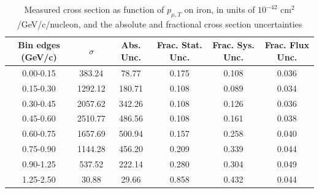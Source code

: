 \documentclass[../main.tex]{subfiles}
\begin{document}
\begin{table}
  \centering
  \renewcommand{\arraystretch}{1.15}
  \caption{Systematic covariance matrix of measured cross section in $p_{\mu,||}$ on iron, in units of $10^{-84}$ $(\text{cm}^2$/GeV/c/nucleon$)^2$}
  \label{tbl:sysnucleonnuc26muon_pzc}
\end{table}
\pagebreak
\begin{turnpage}
\end{turnpage}
\begin{table}
  \centering
  \renewcommand{\arraystretch}{1.15}
  \caption{Measured cross section as function of $p_{\mu,T}$ on iron, in units of $10^{-42}$ $\text{cm}^2$/GeV/c/nucleon, and the absolute and fractional cross section uncertainties}
    \begin{tabular}{c||c|c||c|c|c}
      Bin edges (GeV/c) &  $\sigma$  &  Abs. Unc.  &  Frac. Stat. Unc.  &  Frac. Sys. Unc.  &  Frac. Flux Unc. \\
      \hline
      \hline
      0.00-0.15 & 383.24 & 78.77 & 0.175 & 0.108 & 0.036\\
      0.15-0.30 & 1292.12 & 180.71 & 0.108 & 0.089 & 0.034\\
      0.30-0.45 & 2057.62 & 342.26 & 0.108 & 0.126 & 0.036\\
      0.45-0.60 & 2510.77 & 486.56 & 0.108 & 0.161 & 0.038\\
      0.60-0.75 & 1657.69 & 500.94 & 0.157 & 0.258 & 0.040\\
      0.75-0.90 & 1144.28 & 456.20 & 0.209 & 0.339 & 0.044\\
      0.90-1.25 & 537.52 & 222.14 & 0.280 & 0.304 & 0.049\\
      1.25-2.50 & 30.88 & 29.66 & 0.858 & 0.432 & 0.044
    \end{tabular}
  \label{tbl:datanucleonnuc26muon_pta}
\end{table}
\end{document}
